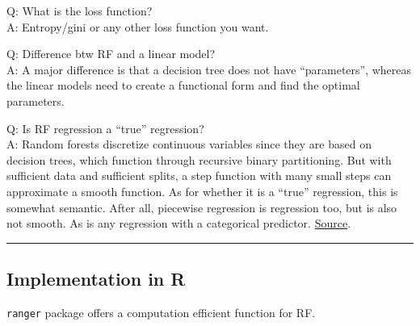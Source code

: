 \documentclass[
  a4paper,
  twoside,
  openright]{book}
\newenvironment{Shaded}{\begin{snugshade}}{\end{snugshade}}
\newcommand{\AttributeTok}[1]{\textcolor[rgb]{0.13,0.29,0.53}{#1}}
\newcommand{\CommentTok}[1]{\textcolor[rgb]{0.56,0.35,0.01}{\textit{#1}}}
\newcommand{\ConstantTok}[1]{\textcolor[rgb]{0.56,0.35,0.01}{#1}}
\newcommand{\FunctionTok}[1]{\textcolor[rgb]{0.13,0.29,0.53}{\textbf{#1}}}
\newcommand{\NormalTok}[1]{#1}
\newcommand{\OtherTok}[1]{\textcolor[rgb]{0.56,0.35,0.01}{#1}}
\newcommand{\SpecialCharTok}[1]{\textcolor[rgb]{0.81,0.36,0.00}{\textbf{#1}}}
\newcommand{\StringTok}[1]{\textcolor[rgb]{0.31,0.60,0.02}{#1}}
\theoremstyle{definition}
\theoremstyle{definition}
\theoremstyle{definition}
\theoremstyle{definition}
\theoremstyle{remark}
\begin{document}
Q: What is the loss function?\\
A: Entropy/gini or any other loss function you want.

Q: Difference btw RF and a linear model?\\
A: A major difference is that a decision tree does not have ``parameters'', whereas the linear models need to create a functional form and find the optimal parameters.

Q: Is RF regression a ``true'' regression?\\
A: Random forests discretize continuous variables since they are based on decision trees, which function through recursive binary partitioning. But with sufficient data and sufficient splits, a step function with many small steps can approximate a smooth function. As for whether it is a ``true'' regression, this is somewhat semantic. After all, piecewise regression is regression too, but is also not smooth. As is any regression with a categorical predictor. \href{https://stats.stackexchange.com/a/408284}{Source}.

\begin{center}\rule{0.5\linewidth}{0.5pt}\end{center}

\subsection*{Implementation in R}\label{implementation-in-r}

\texttt{ranger} package offers a computation efficient function for RF.

\begin{Shaded}
\end{Shaded}
\end{document}

